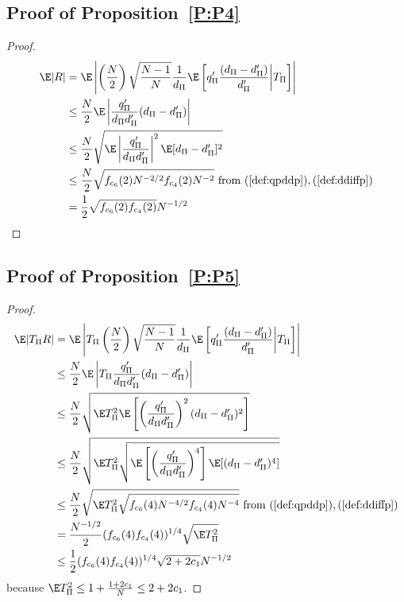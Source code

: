 \subsection{Proof of Proposition~\ref{P:P4}}
\begin{proof}
  \begin{align*}
    \E|R| &= \E \left | \left (\frac{N}{2}\right )
      \sqrt{\frac{N-1}{N}}\frac{1}{d_{\Pi}}\E
      \left [q_{\Pi}'\frac{(d_{\Pi}-d_{\Pi}')}{d_{\Pi}'} \middle | T_{\Pi} \right ]\right | \\
    &\leq \frac{N}{2} \E \left | \frac{q_{\Pi}'}{d_{\Pi}d_{\Pi}'}(d_{\Pi}-d_{\Pi}') \right | \\
    &\leq \frac{N}{2} \sqrt{\E \left | \frac{q_{\Pi}'}{d_{\Pi}d_{\Pi}'} \right |^2
      \E[d_{\Pi}-d_{\Pi}']^2} \\
    &\leq \frac{N}{2} \sqrt{f_{c_6}(2) N^{-2/2} f_{c_4}(2) N^{-2}}
    \text{ from } (\ref{def:qpddp}), (\ref{def:ddiffp}) \\
    &=\frac{1}{2}\sqrt{f_{c_6}(2)f_{c_4}(2)} N^{-1/2}
  \end{align*}
\end{proof}

\subsection{Proof of Proposition~\ref{P:P5}}
\begin{proof}
  \begin{align*}
    \E|T_{\Pi}R| &= \E \left | T_{\Pi} \left (\frac{N}{2}\right )
      \sqrt{\frac{N-1}{N}}\frac{1}{d_{\Pi}}\E
      \left [q_{\Pi}'\frac{(d_{\Pi}-d_{\Pi}')}{d_{\Pi}'} \middle | T_{\Pi} \right ]\right | \\
    &\leq \frac{N}{2} \E \left |T_{\Pi} \frac{q_{\Pi}'}{d_{\Pi}d_{\Pi}'}(d_{\Pi}-d_{\Pi}') \right | \\
    &\leq \frac{N}{2} \sqrt{\E T_{\Pi}^2 \E \left [ \left ( \frac{q_{\Pi}'}{d_{\Pi}d_{\Pi}'} \right )^2
        (d_{\Pi}-d_{\Pi}')^2 \right ] } \\
    &\leq \frac{N}{2} \sqrt{\E T_{\Pi}^2 \sqrt{\E \left [ \left ( \frac{q_{\Pi}'}{d_{\Pi}d_{\Pi}'}
          \right )^4 \right ] \E[(d_{\Pi}-d_{\Pi}')^4] }} \\
    &\leq \frac{N}{2} \sqrt{\E T_{\Pi}^2 \sqrt{f_{c_6}(4) N^{-4/2} f_{c_4}(4) N^{-4}}}
    \text{ from } (\ref{def:qpddp}), (\ref{def:ddiffp}) \\
    &=\frac{N^{-1/2}}{2}(f_{c_6}(4)f_{c_4}(4))^{1/4}\sqrt{\E T_{\Pi}^2} \\
    &\leq \frac{1}{2}(f_{c_6}(4)f_{c_4}(4))^{1/4} \sqrt{2+2c_1} N^{-1/2}
  \end{align*}
  because $\E T_{\Pi}^2 \leq 1 + \frac{1+2c_1}{N} \leq 2 + 2c_1$.
\end{proof}
